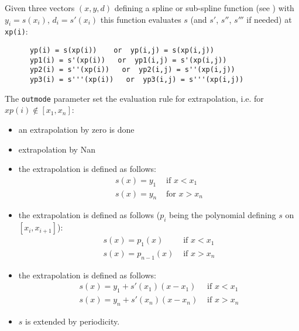 \begin{mandescription}
    Given three vectors $(x,y,d)$ defining a spline or sub-spline function
    (see  ) with $y_i=s(x_i)$, $d_i = s'(x_i)$ this function
    evaluates $s$ (and $s'$, $s''$, $s'''$ if needed) at \verb!xp(i)!:
    
    \begin{verbatim}
      yp(i) = s(xp(i))    or  yp(i,j) = s(xp(i,j))
      yp1(i) = s'(xp(i))   or  yp1(i,j) = s'(xp(i,j))
      yp2(i) = s''(xp(i))   or  yp2(i,j) = s''(xp(i,j))
      yp3(i) = s'''(xp(i))   or  yp3(i,j) = s'''(xp(i,j))
    \end{verbatim}

    The \verb!outmode! parameter set the evaluation rule for extrapolation,
    i.e. for $xp(i)  \notin [x_1,x_n]$: 
    
  \begin{itemize}

       \item {} an extrapolation by zero is done
       \item {} extrapolation by Nan
       \item {} the extrapolation is defined as follows:
      $$
      \begin{array}{ll}
      s(x) = y_1  & \mbox{ if }  x < x_1 \\
      s(x) = y_n  & \mbox{ for } x > x_n
      \end{array}
      $$   

       \item {} the extrapolation is defined as follows ($p_i$ being the polynomial defining 
              $s$ on $[x_i,x_{i+1}]$):
      $$
      \begin{array}{ll}
      s(x) = p_1(x)     &  \mbox{ if }  x < x_1 \\
      s(x) = p_{n-1}(x) &  \mbox{ if }  x > x_n
      \end{array}
      $$   

       \item {} the extrapolation is defined as follows:
      $$
      \begin{array}{ll}
      s(x) = y_1 + s'(x_1)(x-x_1) &  \mbox{ if }  x < x_1 \\
      s(x) = y_n + s'(x_n)(x-x_n) &  \mbox{ if }  x > x_n
      \end{array}
      $$   

       \item {} $s$ is extended by periodicity. 
  \end{itemize}

  \end{mandescription}

